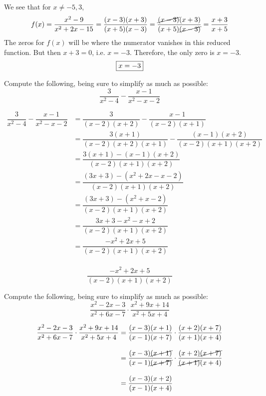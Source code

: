 \documentclass[12pt,letterpaper]{exam}
\begin{document}
\begin{questions}
\begin{enumerate}[(a)]
{\item We see that for $x \neq -5, 3$, 
	\[
	f(x)= \dfrac{x^2 - 9}{x^2 + 2x - 15}= \dfrac{(x - 3)(x + 3)}{(x + 5)(x - 3)}= \dfrac{\cancel{(x - 3)}(x + 3)}{(x + 5)\cancel{(x - 3)}}= \dfrac{x + 3}{x + 5}
	\]
The zeros for $f(x)$ will be where the numerator vanishes in this reduced function. But then $x + 3= 0$, i.e. $x= -3$. Therefore, the only zero is $x= -3$. 
	\[
	\boxed{%
	x= -3
	}
	\] \pspace
}
\end{enumerate}





\newpage
\question[5] Compute the following, being sure to simplify as much as possible: 
	\[
	\dfrac{3}{x^2 - 4} - \dfrac{x - 1}{x^2 - x - 2}
	\] \pspace

	\[
	\begin{aligned}
	\dfrac{3}{x^2 - 4} - \dfrac{x - 1}{x^2 - x - 2}&= \dfrac{3}{(x - 2)(x + 2)} - \dfrac{x - 1}{(x - 2)(x + 1)} \\[0.3cm]
	&= \dfrac{3(x + 1)}{(x - 2)(x + 2)(x + 1)} - \dfrac{(x - 1)(x + 2)}{(x - 2)(x + 1)(x + 2)} \\[0.3cm]
	&= \dfrac{3(x + 1) - (x - 1)(x + 2)}{(x - 2)(x + 1)(x + 2)} \\[0.3cm]
	&= \dfrac{(3x + 3) - (x^2 + 2x - x - 2)}{(x - 2)(x + 1)(x + 2)} \\[0.3cm]
	&= \dfrac{(3x + 3) - (x^2 + x - 2)}{(x - 2)(x + 1)(x + 2)} \\[0.3cm]
	&= \dfrac{3x + 3 - x^2 - x + 2}{(x - 2)(x + 1)(x + 2)} \\[0.3cm]
	&= \dfrac{-x^2 + 2x + 5}{(x - 2)(x + 1)(x + 2)} \\[0.3cm]
	\end{aligned}
	\] \pspace
	
	\[
	\boxed{\dfrac{-x^2 + 2x + 5}{(x - 2)(x + 1)(x + 2)}}
	\]





\newpage
\question[5] Compute the following, being sure to simplify as much as possible:
	\[
	\dfrac{x^2 - 2x - 3}{x^2 + 6x - 7} \cdot \dfrac{x^2 + 9x + 14}{x^2 + 5x + 4} 
	\] \pspace

	\[
	\begin{aligned}
	\dfrac{x^2 - 2x - 3}{x^2 + 6x - 7} \cdot \dfrac{x^2 + 9x + 14}{x^2 + 5x + 4}&= \dfrac{(x - 3)(x + 1)}{(x - 1)(x + 7)} \cdot \dfrac{(x + 2)(x + 7)}{(x + 1)(x + 4)} \\[0.3cm]
	&= \dfrac{(x - 3)\cancel{(x + 1)}}{(x - 1)\cancel{(x + 7)}} \cdot \dfrac{(x + 2)\cancel{(x + 7)}}{\cancel{(x + 1)}(x + 4)} \\[0.3cm]
	&= \dfrac{(x - 3)(x + 2)}{(x - 1)(x + 4)}
	\end{aligned}
	\] \pspace
	

\end{questions}
\end{document}

